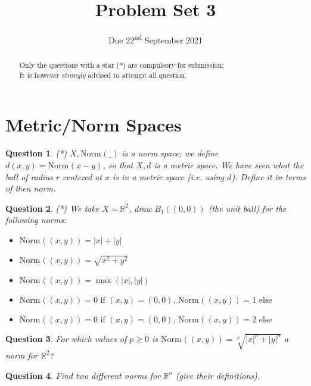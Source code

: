 \documentclass[]{article}
\title{Problem Set 3}
\author{}
\date{Due 22\textsuperscript{nd} September 2021}
\newtheorem{question}{Question}
\newcommand{\R}{\mathbb{R}}
\newcommand{\norm}[2][]{\text{Norm}_{#1}(#2)}
\newcommand{\abs}[1]{| #1 |}
\begin{document}
\maketitle

\begin{abstract}
	Only the questions with a star (*) are compulsory for submission;\\
	It is however \textit{strongly} advised to attempt all question.
\end{abstract}

\section{Metric/Norm Spaces}
\begin{question}
	(*) $X,\norm{\_}$ is a norm space; we define $d(x,y)=\norm{x-y}$, so that $X,d$ is a metric space.
	We have seen what the ball of radius $r$ centered at $x$ is in a metric space (i.e. using $d$).
	Define it in terms of then norm.
\end{question}

\begin{question}
	(*) We take $X=\R^2$, draw $B_1((0,0))$ (the unit ball) for the following norms:
	\begin{itemize}
		\item $\norm{(x,y)}=\abs{x}+\abs{y}$
		\item $\norm{(x,y)}=\sqrt{x^2+y^2}$
		\item $\norm{(x,y)}=\max(\abs{x},\abs{y})$
		\item $\norm{(x,y)}=0 \text{ if } (x,y)=(0,0) \text{, } \norm{(x,y)}=1 \text{ else}$
		\item $\norm{(x,y)}=0 \text{ if } (x,y)=(0,0) \text{, } \norm{(x,y)}=2 \text{ else}$
	\end{itemize}
\end{question}
\begin{question}
	For which values of $p\geq 0$ is $\norm{(x,y)}=\sqrt[p]{\abs{x}^p+\abs{y}^p}$ a norm for $\R^2$?
\end{question}
\begin{question}
	Find two different norms for $\R^n$ (give their definitions).
\end{question}
\end{document}
